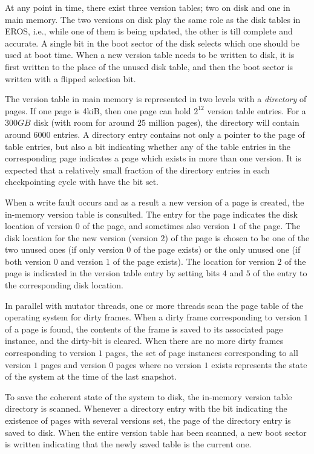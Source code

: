 At any point in time, there exist three version tables; two on disk
and one in main memory.  The two versions on disk play the same role
as the disk tables in EROS, i.e., while one of them is being updated,
the other is till complete and accurate.  A single bit in the boot
sector of the disk selects which one should be used at boot time.
When a new version table needs to be written to disk, it is first
written to the place of the unused disk table, and then the boot
sector is written with a flipped selection bit. 

The version table in main memory is represented in two levels with a
\emph{directory} of pages.  If one page is 4kiB, then one page can
hold $2^{12}$ version table entries.  For a $300GB$ disk (with room
for around $25$ million pages), the directory will contain around
$6000$ entries.  A directory entry contains not only a pointer to the
page of table entries, but also a bit indicating whether any of the
table entries in the corresponding page indicates a page which exists
in more than one version.  It is expected that a relatively small
fraction of the directory entries in each checkpointing cycle with
have the bit set.

When a write fault occurs and as a result a new version of a page is
created, the in-memory version table is consulted.  The entry for the
page indicates the disk location of version $0$ of the page, and
sometimes also version $1$ of the page.  The disk location for the new
version (version $2$) of the page is chosen to be one of the two
unused ones (if only version $0$ of the page exists) or the only
unused one (if both version $0$ and version $1$ of the page exists).
The location for version $2$ of the page is indicated in the version
table entry by setting bits $4$ and $5$ of the entry to the
corresponding disk location. 

In parallel with mutator threads, one or more threads scan the page
table of the operating system for dirty frames.  When a dirty frame
corresponding to version $1$ of a page is found, the contents of the
frame is saved to its associated page instance, and the dirty-bit is
cleared.  When there are no more dirty frames corresponding to version
$1$ pages, the set of page instances corresponding to all version $1$
pages and version $0$ pages where no version $1$ exists represents the
state of the system at the time of the last snapshot.  

To save the coherent state of the system to disk, the in-memory
version table directory is scanned.  Whenever a directory entry with
the bit indicating the existence of pages with several versions set,
the page of the directory entry is saved to disk.  When the entire
version table has been scanned, a new boot sector is written
indicating that the newly saved table is the current one.

